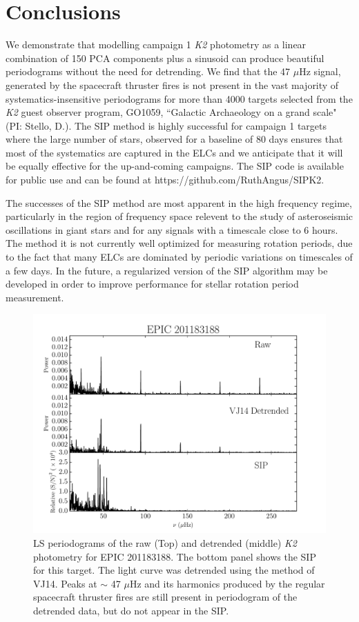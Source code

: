 \documentclass[useAMS, usenatbib, preprint, 12pt]{aastex}
\begin{document}
\section{Conclusions}
\label{sec:conclusions}
We demonstrate that modelling campaign 1 {\it K2} photometry as a linear
combination of 150 PCA components plus a sinusoid can produce beautiful
periodograms without the need for detrending.
We find that the 47 $\mu$Hz signal, generated by the spacecraft thruster
fires is not present in the vast majority of systematics-insensitive
periodograms for more than 4000 targets
selected from the {\it K2} guest observer program, GO1059, ``Galactic
Archaeology on a grand scale" (PI: Stello, D.).
The SIP method is highly successful for campaign 1 targets where the large
number of stars, observed for a baseline of 80 days ensures that most of the
systematics are captured in the ELCs and we anticipate that it will
be equally effective for the up-and-coming campaigns.
The SIP code is available for public use and can be found at
https://github.com/RuthAngus/SIPK2.

The successes of the SIP method are most apparent in the high frequency regime,
particularly in the region of frequency space relevent to the study of
asteroseismic oscillations in giant stars and for any signals with a timescale
close to 6 hours.
The method it is not currently well optimized for measuring rotation periods,
due to the fact that many ELCs are dominated by periodic variations on
timescales of a few days.
In the future, a regularized version of the SIP algorithm may be developed in
order to improve performance for stellar rotation period measurement.

\begin{figure}
\begin{center}
\includegraphics[width=6in, clip=true]{rawvbg_201183188.pdf}
\caption{LS periodograms of the raw (Top) and detrended (middle) {\it K2}
	 photometry for EPIC 201183188.
	 The bottom panel shows the SIP for this target. The light curve was
 	 detrended using the method of VJ14.
	 Peaks at $\sim$ 47 $\mu$Hz and its harmonics produced by the regular
	 spacecraft thruster fires are still present in periodogram of the
	 detrended data, but do not appear in the SIP.}
\label{fig:raw}
\end{center}
\end{figure}
\end{document}
